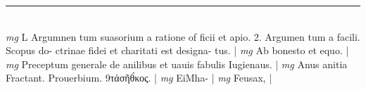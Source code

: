 \documentclass{article}
\begin{document}
\begin{pages}
\vspace{0.5cm}\noindent
\vspace{0.2cm}\rule{1cm}{0.2pt}\\ 
\hspace{0.2cm}\textit{mg}
\footnotesize L Argumnen tum suasorium a ratione of ficii et apio. 2. Argumen tum a facili. Scopus do- ctrinae fidei et charitati est designa- tus. 
\normalsize| 
\hspace{0.2cm}\textit{mg}
\footnotesize Ab bonesto et equo. 
\normalsize| 
\hspace{0.2cm}\textit{mg}
\footnotesize Preceptum generale de anilibus et uauis fabulis Iugienaus. 
\normalsize| 
\hspace{0.2cm}\textit{mg}
\footnotesize Anus anitia Fractant. Prouerbium. 9τάσῆθ́κος. 
\normalsize| 
\hspace{0.2cm}\textit{mg}
\footnotesize EiMha- 
\normalsize| 
\hspace{0.2cm}\textit{mg}
\footnotesize Feusax, 
\normalsize| 

\end{pages}
\end{document}
